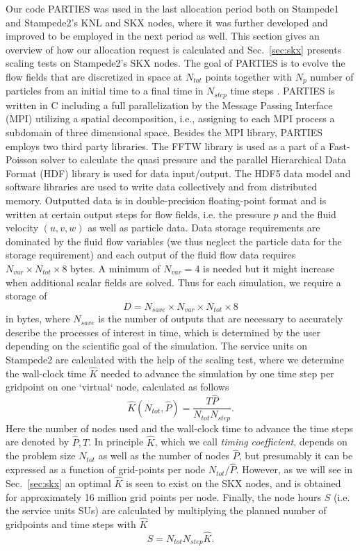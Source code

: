 \documentclass[10pt]{article}
\begin{document}
Our code PARTIES was used in the last allocation period both on Stampede1 and Stampede2's KNL and SKX nodes, where it was  further developed and improved to be employed in the next period as well. This section gives an overview of how our allocation request is calculated and Sec.~\ref{sec:skx} presents scaling tests on Stampede2's SKX nodes. The goal of PARTIES is to evolve the flow fields that are discretized in space at $N_{tot}$ points together with  $N_p$ number of particles from an initial time to a final time in $N_{step}$  time steps . PARTIES  is written in C including a full parallelization by the Message Passing Interface (MPI)  utilizing a spatial decomposition, i.e., assigning to each MPI process a subdomain of three dimensional space.  Besides the MPI library, PARTIES  employs two third party libraries. The FFTW library is used as a part of a  Fast-Poisson solver  to calculate the quasi pressure and the parallel Hierarchical Data Format (HDF) library is used for data input/output. The HDF5 data model and software libraries are used to write data collectively and from distributed memory. Outputted data is in double-precision floating-point format and is written at certain output steps for  flow fields, i.e. the pressure $p$ and the fluid velocity $(u,v,w)$ as well as particle data. Data storage requirements are dominated by the fluid flow variables (we thus neglect the particle data for the storage requirement) and each output of the fluid flow data requires $N_{var}\times N_{tot}\times 8$ bytes. A minimum of $N_{var}=4$ is needed but it might increase when additional scalar fields are solved. Thus for each simulation, we require a storage  of
\begin{equation}
 D=N_{save}\times N_{var}\times N_{tot}\times  8 
\end{equation}
in bytes, where $N_{save}$ is the number of outputs that are necessary to accurately describe the processes of interest in time, which is determined by the user depending on the scientific goal of the simulation. The service units on Stampede2 are calculated with the help of the scaling test, where we determine the wall-clock time $\hat K$ needed to advance the simulation by one time step per gridpoint on one `virtual` node, calculated as follows
\begin{equation}
\hat K(N_{tot}, \hat P) = \frac{T \hat P}{N_{tot}N_{step} }. \label{eq:timing}
\end{equation}
Here the number of nodes used and the wall-clock time to advance the time steps are denoted by $\hat P, T$. In principle $\hat K$, which we call \emph{timing coefficient},  depends on the problem size $N_{tot}$ as well as the number of nodes $\hat P$, but presumably  it can be expressed as a function of grid-points per node $N_{tot}/\hat P$. However, as we will see in Sec.~\ref{sec:skx} an optimal $\hat K$ is seen to exist on the SKX nodes, and is obtained for approximately 16 million grid points per node. Finally, the node hours $S$  (i.e. the service units SUs) are calculated by multiplying the planned number of gridpoints and time steps with $\hat K$
\begin{equation}
S = N_{tot}N_{step} \hat K. \label{eq:SU}
\end{equation}
\end{document}
